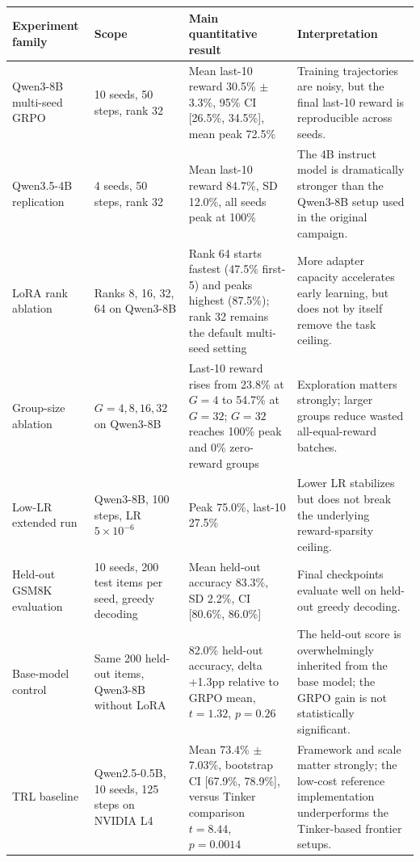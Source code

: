 \small
\begin{center}
\begin{tabularx}{\textwidth}{L{2.7cm}L{3.3cm}L{2.6cm}Y}
\toprule
Experiment family & Scope & Main quantitative result & Interpretation \\
\midrule
Qwen3-8B multi-seed GRPO & 10 seeds, 50 steps, rank 32 & Mean last-10 reward 30.5\% $\pm$ 3.3\%, 95\% CI [26.5\%, 34.5\%], mean peak 72.5\% & Training trajectories are noisy, but the final last-10 reward is reproducible across seeds. \\
Qwen3.5-4B replication & 4 seeds, 50 steps, rank 32 & Mean last-10 reward 84.7\%, SD 12.0\%, all seeds peak at 100\% & The 4B instruct model is dramatically stronger than the Qwen3-8B setup used in the original campaign. \\
LoRA rank ablation & Ranks 8, 16, 32, 64 on Qwen3-8B & Rank 64 starts fastest (47.5\% first-5) and peaks highest (87.5\%); rank 32 remains the default multi-seed setting & More adapter capacity accelerates early learning, but does not by itself remove the task ceiling. \\
Group-size ablation & $G=4,8,16,32$ on Qwen3-8B & Last-10 reward rises from 23.8\% at $G=4$ to 54.7\% at $G=32$; $G=32$ reaches 100\% peak and 0\% zero-reward groups & Exploration matters strongly; larger groups reduce wasted all-equal-reward batches. \\
Low-LR extended run & Qwen3-8B, 100 steps, LR $5\times10^{-6}$ & Peak 75.0\%, last-10 27.5\% & Lower LR stabilizes but does not break the underlying reward-sparsity ceiling. \\
Held-out GSM8K evaluation & 10 seeds, 200 test items per seed, greedy decoding & Mean held-out accuracy 83.3\%, SD 2.2\%, CI [80.6\%, 86.0\%] & Final checkpoints evaluate well on held-out greedy decoding. \\
Base-model control & Same 200 held-out items, Qwen3-8B without LoRA & 82.0\% held-out accuracy, delta +1.3pp relative to GRPO mean, $t=1.32$, $p=0.26$ & The held-out score is overwhelmingly inherited from the base model; the GRPO gain is not statistically significant. \\
TRL baseline & Qwen2.5-0.5B, 10 seeds, 125 steps on NVIDIA L4 & Mean 73.4\% $\pm$ 7.03\%, bootstrap CI [67.9\%, 78.9\%], versus Tinker comparison $t=8.44$, $p=0.0014$ & Framework and scale matter strongly; the low-cost reference implementation underperforms the Tinker-based frontier setups. \\
\bottomrule
\end{tabularx}
\end{center}
\normalsize

